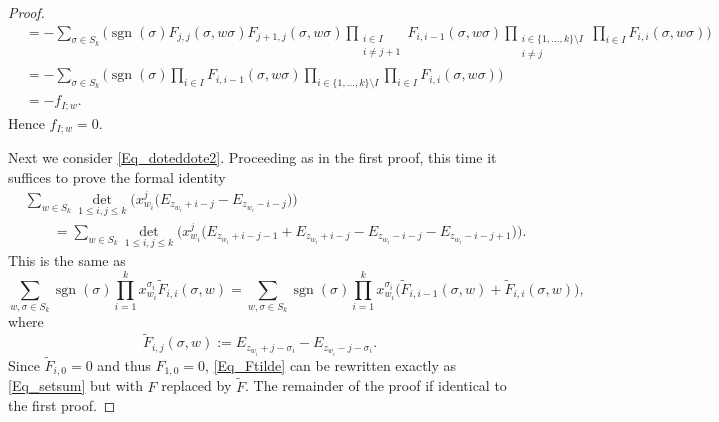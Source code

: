 \documentclass[10pt,a4paper]{amsart}
\DeclareMathOperator{\sgn}{sgn}
\renewcommand{\leq}{\leqslant}
\begin{document}
\begin{proof}
\begin{align*}
&=-\sum_{\sigma\in S_k}\biggl(\sgn(\sigma)
F_{j,j}(\sigma,w\sigma) F_{j+1,j}(\sigma,w\sigma)
\prod_{\substack{i\in I\\[1pt] i\neq j+1}}\! F_{i,i-1}(\sigma,w\sigma)
\!\prod_{\substack{i\in\{1,\dots,k\}\setminus I \\[1pt] i\neq j}}
\prod_{i\in I} F_{i,i}(\sigma,w\sigma)\biggr) \\
&=-\sum_{\sigma\in S_k}\biggl(\sgn(\sigma)
\prod_{i\in I} F_{i,i-1}(\sigma,w\sigma)
\prod_{i\in\{1,\dots,k\}\setminus I}
\prod_{i\in I} F_{i,i}(\sigma,w\sigma)\biggr) \\
&=-f_{I;w}.
\end{align*}
Hence $f_{I;w}=0$.

Next we consider \eqref{Eq_doteddote2}.
Proceeding as in the first proof, this time it suffices to
prove the formal identity
\begin{align*}
&\sum_{w\in S_k} \det_{1\leq i,j\leq k}\bigl(x_{w_i}^j
\bigl(E_{z_{w_i}+i-j}-E_{z_{w_i}-i-j}\bigr)\bigr) \\
&\qquad{}=\sum_{w\in S_k}\det_{1\leq i,j\leq k}\bigl(
x_{w_i}^j \bigl(E_{z_{w_i}+i-j-1}+E_{z_{w_i}+i-j}-
E_{z_{w_i}-i-j}-E_{z_{w_i}-i-j+1}\bigr)\bigr).
\end{align*}
This is the same as
\begin{equation}\label{Eq_Ftilde}
\sum_{w,\sigma\in S_k}\sgn(\sigma)
\prod_{i=1}^k x_{w_i}^{\sigma_i} \tilde{F}_{i,i}(\sigma,w)
=\sum_{w,\sigma\in S_k}\sgn(\sigma) \prod_{i=1}^k
x_{w_i}^{\sigma_i} \bigl( \tilde{F}_{i,i-1}(\sigma,w)+
\tilde{F}_{i,i}(\sigma,w)\bigr),
\end{equation}
where
\[
\tilde{F}_{i,j}(\sigma,w):=E_{z_{w_i}+j-\sigma_i}-E_{z_{w_i}-j-\sigma_i}.
\]
Since $\tilde{F}_{i,0}=0$ and thus $F_{1,0}=0$, \eqref{Eq_Ftilde}
can be rewritten exactly as \eqref{Eq_setsum} but with $F$ replaced
by $\tilde{F}$.
The remainder of the proof if identical to the first proof.
\end{proof}
\end{document}
